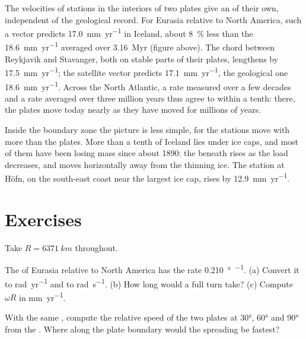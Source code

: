 The velocities of stations in the interiors of two plates give an 
of their own, independent of the geological record. For Eurasia relative to
North America, such a vector predicts \qty{17.0}{mm.yr^{-1}} in Iceland, about
\qty{8}{\percent} less than the \qty{18.6}{mm.yr^{-1}} averaged over
\qty{3.16}{Myr} (figure above). The chord between Reykjavik and Stavanger, both
on stable parts of their plates, lengthens by \qty{17.5}{mm.yr^{-1}}; the
satellite vector predicts \qty{17.1}{mm.yr^{-1}}, the geological one
\qty{18.6}{mm.yr^{-1}}. Across the North Atlantic, a rate measured over a few
decades and a rate averaged over three million years thus agree to within a
tenth: there, the plates move today nearly as they have moved for millions of
years.

Inside the boundary zone the picture is less simple, for the stations move with
more than the plates. More than a tenth of Iceland lies under ice caps, and
most of them have been losing mass since about 1890: the  beneath rises as
the load decreases, and moves horizontally away from the thinning ice. The
station at Höfn, on the south-east coast near the largest ice cap, rises by
\qty{12.9}{mm.yr^{-1}}.

\section{Exercises}

Take $R = \qty{6371}{km}$ throughout.

\begin{exercise}[$\star$]\label{exo:b1:plate-kinematics:1}
The  of Eurasia relative to North America has the rate
\qty{0.210}{\degree\per\Myr}. (a) Convert it to \unit{rad.yr^{-1}} and to
\unit{rad.s^{-1}}. (b) How long would a full turn take? (c) Compute $\omega R$ in
\unit{mm.yr^{-1}}.
\end{exercise}

\begin{exercise}[$\star$]\label{exo:b1:plate-kinematics:2}
With the same , compute the relative speed of the two plates at
\ang{30}, \ang{60} and \ang{90} from the . Where along the plate
boundary would the spreading be fastest?
\end{exercise}


